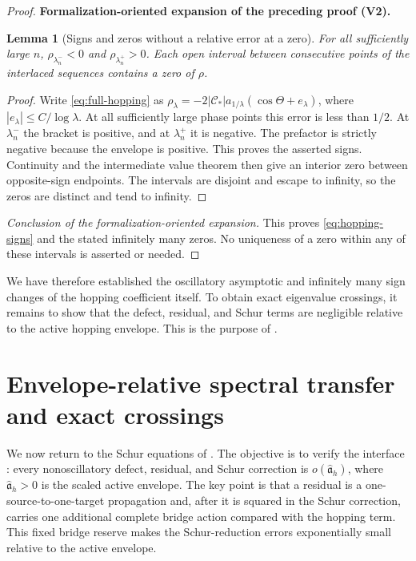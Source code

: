 \documentclass[11pt]{article}
\newtheorem{lemma}[theorem]{Lemma}
\newcommand{\formalisationparentid}{X}
\newenvironment{formalisationaddition}[1]{\par\medskip\begingroup\color{blue}\def\formalisationparentid{#1}\setcounter{formalizationsublemma}{0}\let\lemma\formalizationsublemma\let\endlemma\endformalizationsublemma
  \def\Eo{\mathcal E_h^\circ}\def\EE{\mathcal E_h}\def\phio{\phi_h^\circ}\def\phih{\phi_h}\def\Ho{H_h^{\rm atom}(v^\circ)}\def\Ha{H_h^{\rm atom}}\def\HL{H_h^{L}}\def\Dh{D_h}\def\Log{\operatorname{Log}}\def\ellh{\ell_h}\def\Gp{G_{p,h}}\def\Ast{A_{*,h}}\def\ahat{\widehat{\mathfrak a}_h}\def\ah{\mathfrak a_h}\def\rh{\widehat\rho_h}\def\deltah{\widehat\delta_h}\def\oldref##1{\textup{(##1)}}\def\interface##1{\par\noindent\textit{Analytical interface used here.} ##1\par}\def\finish{\par\noindent\textit{Conclusion of the formalization-oriented expansion.} }\par\noindent\textbf{Formalization-oriented expansion of the preceding proof (V2).}\par\smallskip
}{\par\endgroup\medskip
}
\begin{document}
\begin{proof}
\begin{formalisationaddition}{C7.4}
\begin{lemma}[Signs and zeros without a relative error at a zero]\label{sublemma:C7-4-signs}
For all sufficiently large $n$, $\rho_{\lambda_n^-}<0$ and $\rho_{\lambda_n^+}>0$. Each open interval between consecutive points of the interlaced sequences contains a zero of $\rho$.
\end{lemma}
\begin{proof}
Write \eqref{eq:full-hopping} as $\rho_\lambda=-2|\mathscr C_*|a_{1/\lambda}(\cos\Theta+e_\lambda)$, where $|e_\lambda|\le C/\log\lambda$. At all sufficiently large phase points this error is less than $1/2$. At $\lambda_n^-$ the bracket is positive, and at $\lambda_n^+$ it is negative. The prefactor is strictly negative because the envelope is positive. This proves the asserted signs. Continuity and the intermediate value theorem then give an interior zero between opposite-sign endpoints. The intervals are disjoint and escape to infinity, so the zeros are distinct and tend to infinity.
\end{proof}
\finish This proves \eqref{eq:hopping-signs} and the stated infinitely many zeros. No uniqueness of a zero within any of these intervals is asserted or needed.
\end{formalisationaddition}

\end{proof}

We have therefore established the oscillatory asymptotic and infinitely many
sign changes of the hopping coefficient itself.  To obtain exact eigenvalue
crossings, it remains to show that the defect, residual, and Schur terms are
negligible relative to the active hopping envelope.  This is the purpose of
.

\section{Envelope-relative spectral transfer and exact crossings}
\label{sec:spectral-transfer}
We now return to the Schur equations of .
The objective is to verify the interface
: every nonoscillatory defect, residual, and
Schur correction is $o(\widehat{\mathfrak a}_h)$, where
$\widehat{\mathfrak a}_h>0$ is the scaled active envelope.  The key point is
that a residual is a one-source-to-one-target propagation and, after it is
squared in the Schur correction, carries one additional complete bridge
action compared with the hopping term.  This fixed bridge reserve makes the
Schur-reduction errors exponentially small relative to the active envelope.
\end{document}

